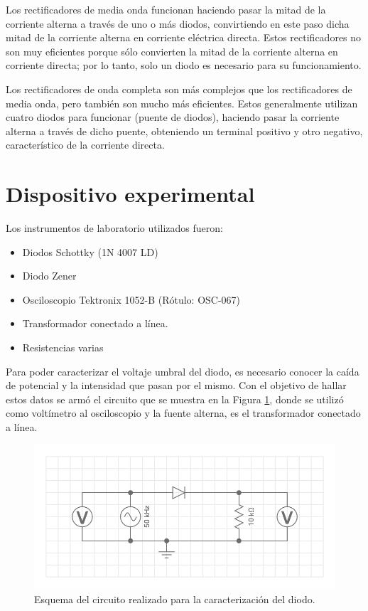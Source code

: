\documentclass[twoside,twocolumn,a4paper]{article}
\begin{document}
Los rectificadores de media onda funcionan haciendo pasar la mitad de la corriente alterna a trav\'es de uno o m\'as diodos, convirtiendo en este paso dicha mitad de la corriente alterna en corriente el\'ectrica directa. Estos rectificadores no son muy eficientes porque s\'olo convierten la mitad de la corriente alterna en corriente directa; por lo tanto, solo un diodo es necesario para su funcionamiento.\par

Los rectificadores de onda completa son m\'as complejos que los rectificadores de media onda, pero tambi\'en son mucho m\'as eficientes. Estos generalmente utilizan cuatro diodos para funcionar (puente de diodos), haciendo pasar la corriente alterna a trav\'es de dicho puente, obteniendo un terminal positivo y otro negativo, caracter\'istico de la corriente directa.



\section{Dispositivo experimental}
Los instrumentos de laboratorio utilizados fueron:
\begin{itemize}
\item 
\label{diodo} Diodos Schottky (1N 4007 LD)%
\item 
\label{zener} Diodo Zener
\item 
\label{osc} Osciloscopio Tektronix 1052-B (R\'otulo: OSC-067) %
\item
\label{trans} Transformador conectado a l\'inea. 
\item Resistencias varias
\end{itemize}

Para poder caracterizar el voltaje umbral del diodo, es necesario conocer la ca\'ida de potencial y la intensidad que pasan por el mismo. Con el objetivo de hallar estos datos se arm\'o el circuito que se muestra en la Figura \ref{fig:dsp_exp}, donde se utiliz\'o como volt\'imetro al osciloscopio y la fuente alterna, es el transformador conectado a l\'inea. 

\begin{figure}[h!]
\includegraphics[width=\linewidth]{disp_exp.png}
\captionsetup{justification=centering}
\caption{Esquema del circuito realizado para la caracterizaci\'on del diodo.}
\label{fig:dsp_exp}
\end{figure}
\end{document}
